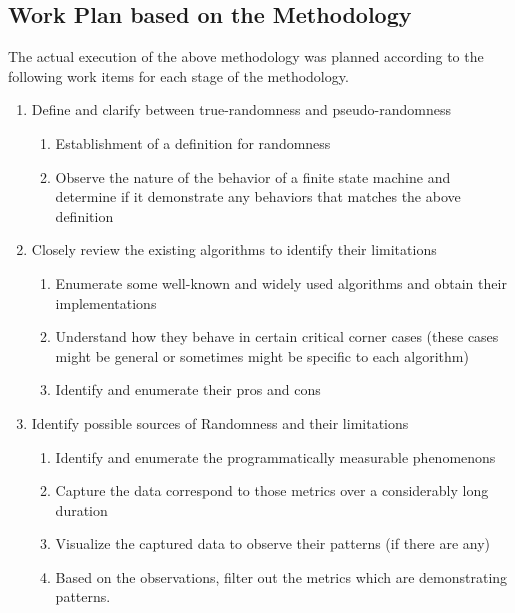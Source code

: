 \documentclass{scrartcl}
\begin{document}
    \subsection{Work Plan based on the Methodology}
        The actual execution of the above methodology was planned according to the following work items for each stage of the methodology.
        \begin{enumerate}[ref=\theenumi]
            \item Define and clarify between true-randomness and pseudo-randomness
            \begin{enumerate}[ref=\theenumi.\theenumii]
                \item\label{def_rnd} Establishment of a definition for randomness
                \item\label{obs_fsm} Observe the nature of the behavior of a finite state machine and determine if it demonstrate any behaviors that matches the above definition
            \end{enumerate}
            
            \item Closely review the existing algorithms to identify their limitations
            \begin{enumerate}[ref=\theenumi.\theenumii]
                \item\label{id_alg} Enumerate some well-known and widely used algorithms and obtain their implementations
                \item\label{und_alg} Understand how they behave in certain critical corner cases (these cases might be general or sometimes might be specific to each algorithm)
                \item\label{alg_pro_con} Identify and enumerate their pros and cons
            \end{enumerate}
            
            \item Identify possible sources of Randomness and their limitations
            \begin{enumerate}[ref=\theenumi.\theenumii]
                \item\label{id_measures} Identify and enumerate the programmatically measurable phenomenons
                \item\label{capt_data} Capture the data correspond to those metrics over a considerably long duration
                \item\label{vis_data} Visualize the captured data to observe their patterns (if there are any)
                \item\label{filter_met} Based on the observations, filter out the metrics which are demonstrating patterns.
            \end{enumerate}
            

\end{enumerate}
\end{document}
